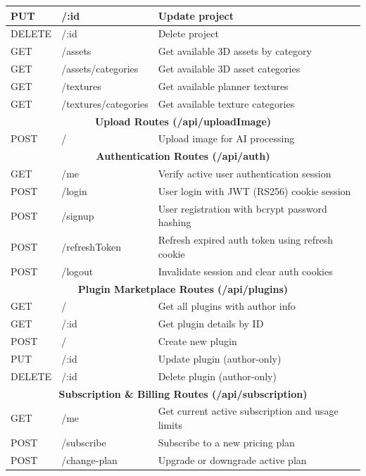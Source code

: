\begin{longtable}{|p{2cm}|p{4cm}|p{6.5cm}|}
    \hline
    PUT & /:id & Update project \\
    \hline
    DELETE & /:id & Delete project \\
    \hline
    GET & /assets & Get available 3D assets by category \\
    \hline
    GET & /assets/categories & Get available 3D asset categories \\
    \hline
    GET & /textures & Get available planner textures \\
    \hline
    GET & /textures/categories & Get available texture categories \\
    \hline
    \multicolumn{3}{|c|}{\textbf{Upload Routes (/api/uploadImage)}} \\
    \hline
    POST & / & Upload image for AI processing \\
    \hline
    \multicolumn{3}{|c|}{\textbf{Authentication Routes (/api/auth)}} \\
    \hline
    GET & /me & Verify active user authentication session \\
    \hline
    POST & /login & User login with JWT (RS256) cookie session \\
    \hline
    POST & /signup & User registration with bcrypt password hashing \\
    \hline
    POST & /refreshToken & Refresh expired auth token using refresh cookie \\
    \hline
    POST & /logout & Invalidate session and clear auth cookies \\
    \hline
    \multicolumn{3}{|c|}{\textbf{Plugin Marketplace Routes (/api/plugins)}} \\
    \hline
    GET & / & Get all plugins with author info \\
    \hline
    GET & /:id & Get plugin details by ID \\
    \hline
    POST & / & Create new plugin \\
    \hline
    PUT & /:id & Update plugin (author-only) \\
    \hline
    DELETE & /:id & Delete plugin (author-only) \\
    \hline
    \multicolumn{3}{|c|}{\textbf{Subscription \& Billing Routes (/api/subscription)}} \\
    \hline
    GET & /me & Get current active subscription and usage limits \\
    \hline
    POST & /subscribe & Subscribe to a new pricing plan \\
    \hline
    POST & /change-plan & Upgrade or downgrade active plan \\

\end{longtable}
